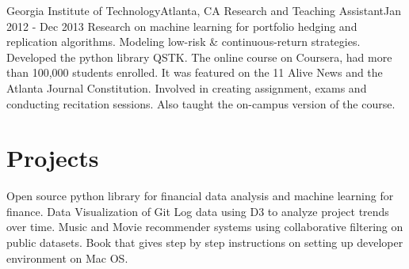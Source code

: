 \documentclass[letterpaper,11pt]{article}
\begin{document}
    \resumeSubheading
      {Georgia Institute of Technology}{Atlanta, CA}
      {Research and Teaching Assistant}{Jan 2012 - Dec 2013}
      \resumeItemListStart
          {Research on machine learning for portfolio hedging and replication algorithms. Modeling low-risk \& continuous-return strategies. Developed the python library QSTK.}
          {The online course on Coursera, had more than 100,000 students enrolled. It was featured on the 11 Alive News and the Atlanta Journal Constitution. Involved in creating assignment, exams and conducting recitation sessions. Also taught the on-campus version of the course.}
      \resumeItemListEnd

  \resumeSubHeadingListEnd


\section{Projects}
  \resumeSubHeadingListStart
      {Open source python library for financial data analysis and machine learning for finance.}
      {Data Visualization of Git Log data using D3 to analyze project trends over time.}
      {Music and Movie recommender systems using collaborative filtering on public datasets.}
      {Book that gives step by step instructions on setting up developer environment on Mac OS.}
  \resumeSubHeadingListEnd

%


\end{document}
